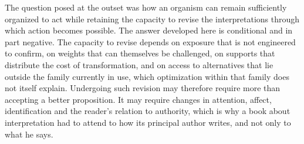 The question posed at the outset was how an organism can remain sufficiently organized to act while retaining the capacity to revise the interpretations through which action becomes possible. The answer developed here is conditional and in part negative. The capacity to revise depends on exposure that is not engineered to confirm, on weights that can themselves be challenged, on supports that distribute the cost of transformation, and on access to alternatives that lie outside the family currently in use, which optimization within that family does not itself explain. Undergoing such revision may therefore require more than accepting a better proposition. It may require changes in attention, affect, identification and the reader's relation to authority, which is why a book about interpretation had to attend to how its principal author writes, and not only to what he says.
